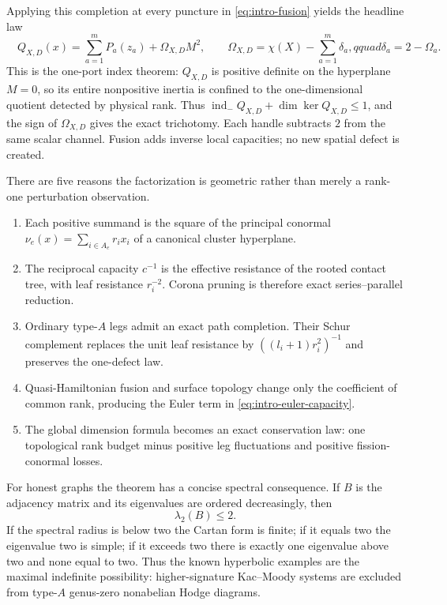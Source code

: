 \documentclass[11pt,a4paper]{amsart}
\theoremstyle{plain}
\theoremstyle{definition}
\newcommand{\indm}{\operatorname{ind}_{-}}
\begin{document}
Applying this completion at every puncture in \eqref{eq:intro-fusion} yields the headline law
\begin{equation}\label{eq:intro-euler-capacity}
 \boxed{\quad Q_{X,D}(x)=\sum_{a=1}^mP_a(z_a)+\Omega_{X,D}M^2,
 \qquad
 \Omega_{X,D}=\chi(X)-\sum_{a=1}^m\delta_a,qquad
 \delta_a=2-\Omega_a.\quad}
\end{equation}
This is the one-port index theorem: $Q_{X,D}$ is positive definite on the hyperplane $M=0$,
so its entire nonpositive inertia is confined to the one-dimensional quotient detected by physical
rank.  Thus $\indm Q_{X,D}+\dim\ker Q_{X,D}\le1$, and the sign of $\Omega_{X,D}$ gives the exact
trichotomy.  Each handle subtracts $2$ from the same scalar channel.  Fusion adds inverse local
capacities; no new spatial defect is created.

There are five reasons the factorization is geometric rather than merely a rank-one perturbation
observation.
\begin{enumerate}[label=(\roman*),leftmargin=2.2em]
\item Each positive summand is the square of the principal conormal
$\nu_e(x)=\sum_{i\in A_e}r_ix_i$ of a canonical cluster hyperplane.
\item The reciprocal capacity $c^{-1}$ is the effective resistance of the rooted contact tree,
with leaf resistance $r_i^{-2}$.  Corona pruning is therefore exact series--parallel reduction.
\item Ordinary type-$A$ legs admit an exact path completion.  Their Schur complement replaces the
unit leaf resistance by $((l_i+1)r_i^2)^{-1}$ and preserves the one-defect law.
\item Quasi-Hamiltonian fusion and surface topology change only the coefficient of common rank,
producing the Euler term in \eqref{eq:intro-euler-capacity}.
\item The global dimension formula becomes an exact conservation law: one topological rank budget
minus positive leg fluctuations and positive fission-conormal losses.
\end{enumerate}

For honest graphs the theorem has a concise spectral consequence.  If $B$ is the adjacency matrix
and its eigenvalues are ordered decreasingly, then
\[
                         \lambda_2(B)\le2.
\]
If the spectral radius is below two the Cartan form is finite; if it equals two the eigenvalue two
is simple; if it exceeds two there is exactly one eigenvalue above two and none equal to two.  Thus
the known hyperbolic examples are the maximal indefinite possibility: higher-signature
Kac--Moody systems are excluded from type-$A$ genus-zero nonabelian Hodge diagrams.
\end{document}
